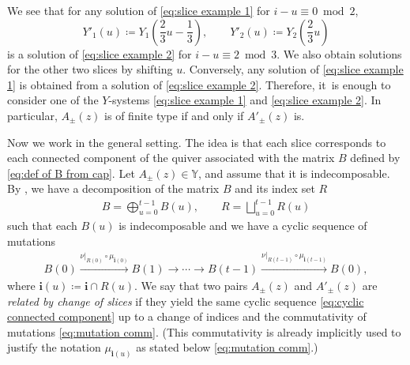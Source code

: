 \documentclass[pdftex]{sigma}
\numberwithin{equation}{section}
\theoremstyle{definition}
\begin{document}
We see that for any solution of \eqref{eq:slice example 1} for $i- u \equiv 0 \bmod 2$,
\begin{equation*}
 Y'_1(u) \coloneqq Y_1 \left(\frac{2}{3}u - \frac{1}{3}\right),\qquad
 Y'_2(u) \coloneqq Y_2 \left(\frac{2}{3}u\right)
\end{equation*}
is a solution of \eqref{eq:slice example 2} for $i - u \equiv 2 \bmod 3$.
We also obtain solutions for the other two slices by shifting $u$.
Conversely, any solution of \eqref{eq:slice example 1} is obtained from a solution of \eqref{eq:slice example 2}.
Therefore, it~is enough to consider one of the $Y$-systems \eqref{eq:slice example 1} and \eqref{eq:slice example 2}.
In particular, $A_\pm(z)$ is of finite type if and only if $A'_\pm(z)$ is.

Now we work in the general setting.
The idea is that each slice corresponds to each connected component of the quiver
associated with the matrix $B$ defined by \eqref{eq:def of B from cap}.
Let $A_\pm(z) \in \mathbb{Y}$, and assume that it is indecomposable.
By \cite[Proposition 3.24]{mizuno2020difference}, we have a decomposition of
the matrix $B$ and its index set $R$
\begin{align*}
 B = \bigoplus_{u=0}^{t-1} B(u), \qquad
 R = \bigsqcup_{u=0}^{t-1} R(u)
\end{align*}
such that each $B(u)$ is indecomposable and we have a cyclic sequence of mutations
\begin{align}\label{eq:cyclic connected component}
 B(0) \xrightarrow{\nu|_{R(0)} \circ \mu_{\boldsymbol{i}(0)}} B(1)
 \longrightarrow
 \cdots
 \longrightarrow
 B(t-1)
 \xrightarrow{\nu|_{R(t-1)} \circ \mu_{\boldsymbol{i}(t-1)}}
 B(0),
\end{align}
where $\boldsymbol{i}(u) \coloneqq \boldsymbol{i} \cap R(u)$.
We say that two pairs $A_\pm(z)$ and $A'_\pm (z)$ are \emph{related by change of slices}
if they yield the same cyclic sequence \eqref{eq:cyclic connected component} up to a change
of indices and the commutativity of mutations \eqref{eq:mutation comm}. (This commutativity is
already implicitly used to justify the notation $\mu_{\boldsymbol{i}(u)}$ as stated below \eqref{eq:mutation comm}.)
\end{document}
